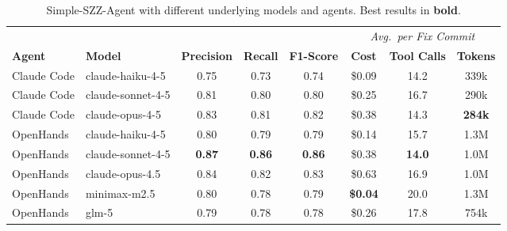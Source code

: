 \begin{table}[t]
\centering
\caption{Simple-SZZ-Agent with different underlying models and agents. Best results in \textbf{bold}.}
\label{tab:results_cheaper_models}
\begin{tabular}{llcccccc}
\toprule
 & & & & & \multicolumn{3}{c}{\textit{Avg.\ per Fix Commit}} \\
\cmidrule(l){6-8}
\textbf{Agent} & \textbf{Model} & \textbf{Precision} & \textbf{Recall} & \textbf{F1-Score} & \textbf{Cost} & \textbf{Tool Calls} & \textbf{Tokens} \\
\midrule
Claude Code & claude-haiku-4-5 & 0.75 & 0.73 & 0.74 & \$0.09 & 14.2 & 339k \\
Claude Code & claude-sonnet-4-5 & 0.81 & 0.80 & 0.80 & \$0.25 & 16.7 & 290k \\
Claude Code & claude-opus-4-5 & 0.83 & 0.81 & 0.82 & \$0.38 & 14.3 & \textbf{284k} \\
\midrule
OpenHands & claude-haiku-4-5 & 0.80 & 0.79 & 0.79 & \$0.14 & 15.7 & 1.3M \\
OpenHands & claude-sonnet-4-5 & \textbf{0.87} & \textbf{0.86} & \textbf{0.86} & \$0.38 & \textbf{14.0} & 1.0M \\
OpenHands & claude-opus-4.5 & 0.84 & 0.82 & 0.83 & \$0.63 & 16.9 & 1.0M \\
OpenHands & minimax-m2.5 & 0.80 & 0.78 & 0.79 & \textbf{\$0.04} & 20.0 & 1.3M \\
OpenHands & glm-5 & 0.79 & 0.78 & 0.78 & \$0.26 & 17.8 & 754k \\
\bottomrule
\end{tabular}
\end{table}
